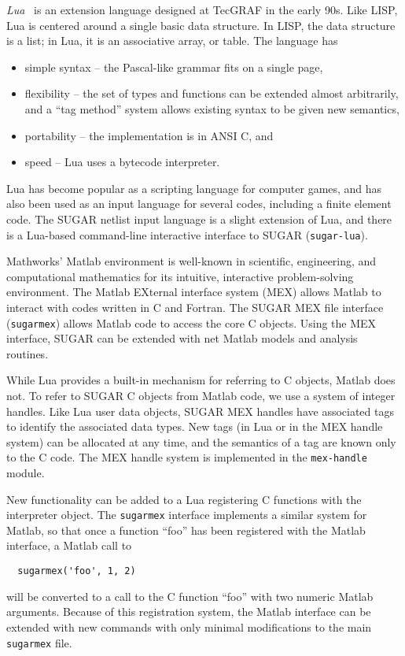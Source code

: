 \emph{Lua}~\cite{Lua01} is an extension language designed at TecGRAF 
in the early 90s.
Like LISP, Lua is centered around a single basic data structure.  In LISP,
the data structure is a list; in Lua, it is an associative array, or table.
The language has
\begin{itemize}
  \item simple syntax -- the Pascal-like grammar fits on a single page,
  \item flexibility -- the set of types and functions can be extended 
        almost arbitrarily, and a ``tag method'' system allows existing 
        syntax to be given new semantics,
  \item portability -- the implementation is in ANSI C, and 
  \item speed -- Lua uses a bytecode interpreter.
\end{itemize}
Lua has become popular as a scripting language for computer games, and
has also been used as an input language for several codes,
including a finite element code.  The SUGAR netlist input language is a
slight extension of Lua, and there is a Lua-based command-line interactive
interface to SUGAR (\verb|sugar-lua|).

Mathworks' Matlab environment is well-known in scientific, engineering,
and computational mathematics for its intuitive, interactive problem-solving
environment.  The Matlab EXternal interface system (MEX) allows Matlab
to interact with codes written in C and Fortran.  The SUGAR MEX file
interface (\verb|sugarmex|) allows Matlab code to access the core C objects.
Using the MEX interface, SUGAR can be extended with net Matlab models 
and analysis routines.

While Lua provides a built-in mechanism for referring to C objects,
Matlab does not.  To refer to SUGAR C objects from Matlab code,
we use a system of integer handles.  Like Lua user data objects,
SUGAR MEX handles have associated tags to identify the associated
data types.  New tags (in Lua or in the MEX handle system) can be
allocated at any time, and the semantics of a tag are known only
to the C code.  The MEX handle system is implemented in the \verb|mex-handle|
module.

New functionality can be added to a Lua registering C functions with
the interpreter object.  The \verb|sugarmex| interface implements a
similar system for Matlab, so that once a function ``foo'' has been
registered with the Matlab interface, a Matlab call to
\begin{verbatim}
  sugarmex('foo', 1, 2)
\end{verbatim}
will be converted to a call to the C function ``foo'' with two numeric
Matlab arguments.  Because of this registration system, the Matlab
interface can be extended with new commands with only minimal modifications
to the main \verb|sugarmex| file.
